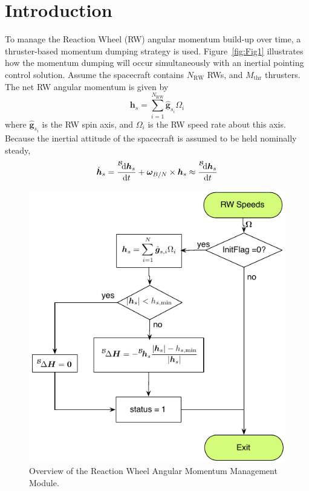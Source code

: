 \documentclass[]{BasiliskReportMemo}
\begin{document}
\section{Introduction}
To manage the Reaction Wheel (RW) angular momentum build-up over time, a thruster-based momentum dumping strategy is used.  Figure~\ref{fig:Fig1} illustrates how the momentum dumping will occur simultaneously with an inertial pointing control solution.  Assume the spacecraft contains $N_{\text{RW}}$ RWs, and $M_{\text{thr}}$ thrusters. The net RW angular momentum is given by
\begin{equation}
	\bm h_{s} = \sum_{i=1}^{N_{\text{RW}}} \hat{\bm g}_{s_{i}} \Omega_{i}
\end{equation} 
where $\hat{\bm g}_{s_{i}}$ is the RW spin axis, and $\Omega_{i}$ is the RW speed rate about this axis.  
Because the inertial attitude of the spacecraft is assumed to be held nominally steady, 
\begin{equation}
	\dot{\bm h}_{s} = \frac{\leftexp{B}{\D}\bm h_{s}}{\D t} + \bm\omega_{B/N} \times \bm h_{s} \approx \frac{\leftexp{B}{\D}\bm h_{s}}{\D t}
\end{equation}






\begin{figure}[tp]
	\centerline{
	\includegraphics[]{Figures/rwMomentumManagement}
	}
	\caption{Overview of the Reaction Wheel Angular Momentum Management Module.}
	\label{fig:Fig2}
\end{figure}
\end{document}
